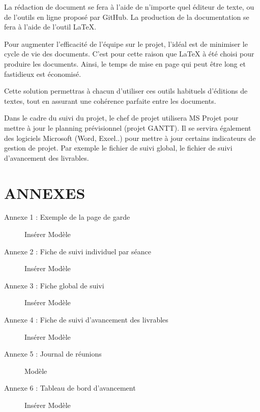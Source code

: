 La rédaction de document se fera à l’aide de n’importe quel éditeur de texte, ou de l'outils en ligne proposé par GitHub.
La production de la documentation se fera à l’aide de l'outil LaTeX.

Pour augmenter l'efficacité de l'équipe sur le projet, l’idéal est de minimiser le cycle de vie des documents.
C'est pour cette raison que LaTeX à été choisi pour produire les documents. Ainsi, le temps de mise en page qui peut être long et fastidieux est économisé.

Cette solution permettras à chacun  d’utiliser ces outils habituels d’éditions de textes, tout en assurant une cohérence parfaite entre les documents.

Dans le cadre du suivi du projet, le chef de projet utilisera MS Projet pour mettre à jour le planning 
prévisionnel (projet GANTT). Il se servira également des logiciels Microsoft (Word, Excel..) pour mettre à jour certains indicateurs de gestion de projet. Par exemple le fichier de suivi global, le fichier de suivi d'avancement des livrables.


\section{ANNEXES}
\begin{description}
\item[Annexe 1 : Exemple de la page de garde]
    {Insérer Modèle}
\item[Annexe 2 : Fiche de suivi individuel par séance]
    Insérer Modèle
\item[Annexe 3 : Fiche global de suivi]
    Insérer Modèle
\item[Annexe 4 : Fiche de suivi d'avancement des livrables]
    Insérer Modèle
\item[Annexe 5 : Journal de réunions]
    Modèle
\item[Annexe 6 : Tableau de bord d'avancement]
    Insérer Modèle
\end{description}
